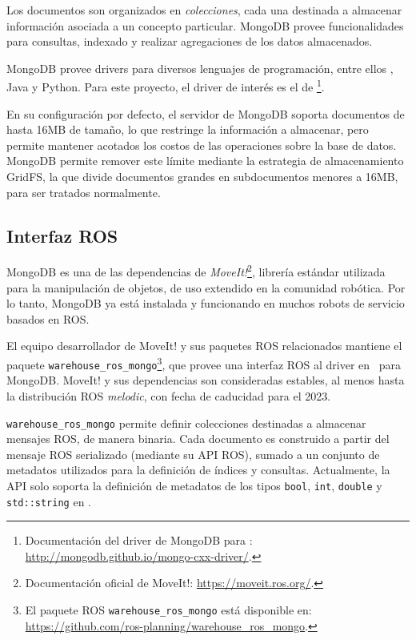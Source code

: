 Los documentos son organizados en \textit{colecciones}, cada una destinada a almacenar información asociada a un concepto particular. MongoDB provee funcionalidades para consultas, indexado y realizar agregaciones de los datos almacenados.

MongoDB provee drivers para diversos lenguajes de programación, entre ellos \CC, Java y Python. Para este proyecto, el driver de interés es el de \CC\footnote{Documentación del driver de MongoDB para \CC:  \url{http://mongodb.github.io/mongo-cxx-driver/}.}.

En su configuración por defecto, el servidor de MongoDB soporta documentos de hasta 16MB de tamaño, lo que restringe la información a almacenar, pero permite mantener acotados los costos de las operaciones sobre la base de datos. MongoDB permite remover este límite mediante la estrategia de almacenamiento GridFS, la que divide documentos grandes en subdocumentos menores a 16MB, para ser tratados normalmente.

\subsection{Interfaz ROS}

MongoDB es una de las dependencias de \textit{MoveIt!}\footnote{Documentación oficial de MoveIt!: \url{https://moveit.ros.org/}.}, librería estándar utilizada para la manipulación de objetos, de uso extendido en la comunidad robótica. Por lo tanto, MongoDB ya está instalada y funcionando en muchos robots de servicio basados en ROS. 

El equipo desarrollador de MoveIt! y sus paquetes ROS relacionados mantiene el paquete \texttt{warehouse\_ros\_mongo}\footnote{El paquete ROS \texttt{warehouse\_ros\_mongo} está disponible en: \url{https://github.com/ros-planning/warehouse\_ros\_mongo}.}, que provee una interfaz ROS al driver en \CC\ para MongoDB. MoveIt! y sus dependencias son consideradas estables, al menos hasta la distribución ROS \textit{melodic}, con fecha de caducidad para el 2023.

\texttt{warehouse\_ros\_mongo} permite definir colecciones destinadas a almacenar mensajes ROS, de manera binaria. Cada documento es construido a partir del mensaje ROS serializado (mediante su API ROS), sumado a un conjunto de metadatos utilizados para la definición de índices y consultas. Actualmente, la API solo soporta la definición de metadatos de los tipos \texttt{bool}, \texttt{int}, \texttt{double} y \texttt{std::string} en \CC.


